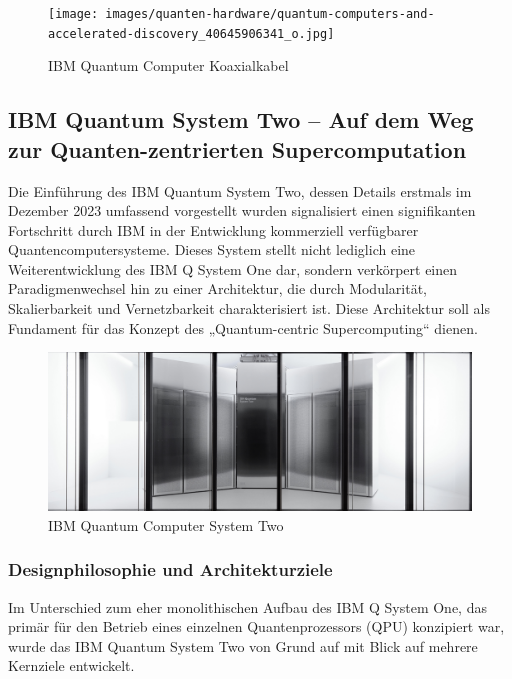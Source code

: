 \begin{figure}[H]
    \centering
    \texttt{[image: images/quanten-hardware/quantum-computers-and-accelerated-discovery\_40645906341\_o.jpg]}
    \caption{IBM Quantum Computer Koaxialkabel}
    \label{fig:quantumkoaxialkabel}
\end{figure}


\subsection{IBM Quantum System Two – Auf dem Weg zur Quanten-zentrierten Supercomputation}
Die Einführung des IBM Quantum System Two, dessen Details erstmals im Dezember 2023 umfassend vorgestellt wurden 
signalisiert einen signifikanten Fortschritt durch IBM in der Entwicklung kommerziell verfügbarer Quantencomputersysteme. Dieses System stellt nicht lediglich eine Weiterentwicklung des IBM Q System One dar, sondern verkörpert einen Paradigmenwechsel hin zu einer Architektur, die durch Modularität, Skalierbarkeit und Vernetzbarkeit charakterisiert ist. Diese Architektur soll als Fundament für das Konzept des „Quantum-centric Supercomputing“ dienen.

\begin{figure}[H]
    \centering
    \includegraphics[width=\textwidth]{images/quanten-hardware/IBM-Quantum_System-Two_Riken_banner.jpg}
    \caption{IBM Quantum Computer System Two}
    \label{fig:ibmquantumsystemtwo}
\end{figure}


\subsubsection{Designphilosophie und Architekturziele}
Im Unterschied zum eher monolithischen Aufbau des IBM Q System One, das primär für den Betrieb eines einzelnen Quantenprozessors (QPU) konzipiert war, wurde das IBM Quantum System Two von Grund auf mit Blick auf mehrere Kernziele entwickelt. 

